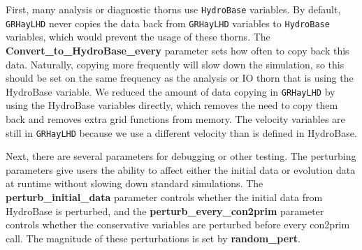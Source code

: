 \documentclass{article}
\newcommand{\ghd}{\texttt{GRHayLHD}\xspace}
\newcommand{\hydrobase}{\texttt{HydroBase}\xspace}
\begin{document}
First, many analysis or diagnostic thorns use \hydrobase variables.
By default, \ghd never copies the data back from \ghd variables
to \hydrobase variables, which would prevent the usage of these
thorns. The \textbf{Convert\_to\_HydroBase\_every} parameter
sets how often to copy back this data. Naturally, copying more
frequently will slow down the simulation, so this should be set
on the same frequency as the analysis or IO thorn that is using
the HydroBase variable. We reduced the amount of data copying in \ghd
by using the HydroBase variables directly, which removes the need
to copy them back and removes extra grid functions from memory.
The velocity variables are still in \ghd because we use a different
velocity than is defined in HydroBase.

Next, there are several parameters for debugging or other testing.
The perturbing parameters give users the ability to affect either
the initial data or evolution data at runtime without slowing down
standard simulations. The \textbf{perturb\_initial\_data} parameter
controls whether the initial data from HydroBase is perturbed, and
the \textbf{perturb\_every\_con2prim} parameter controls whether
the conservative variables are perturbed before every con2prim call.
The magnitude of these perturbations is set by \textbf{random\_pert}.

\end{document}
